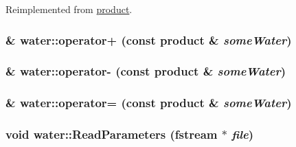 Reimplemented from \hyperlink{classproduct_afcbfb1feadfd4ed057845eab47e37ff5}{product}.\hypertarget{classwater_a3c598f40a21761c6945ac73521d68d3e}{
\subsubsection[{operator+}]{ \& water::operator+ (const {\bf product} \& {\em someWater})}}
\label{classwater_a3c598f40a21761c6945ac73521d68d3e}
\hypertarget{classwater_ae7f1f4f0d058090bb747b3f10d6f4c79}{
\subsubsection[{operator-\/}]{ \& water::operator-\/ (const {\bf product} \& {\em someWater})}}
\label{classwater_ae7f1f4f0d058090bb747b3f10d6f4c79}
\hypertarget{classwater_aa4611d10961d930814c6f24cd9b8a066}{
\subsubsection[{operator=}]{ \& water::operator= (const {\bf product} \& {\em someWater})}}
\label{classwater_aa4611d10961d930814c6f24cd9b8a066}
\hypertarget{classwater_aab74d08e63e58b7c8d3f2ef482673a21}{
\subsubsection[{ReadParameters}]{\setlength{\rightskip}{0pt plus 5cm}void water::ReadParameters (fstream $\ast$ {\em file})}}
\label{classwater_aab74d08e63e58b7c8d3f2ef482673a21}


